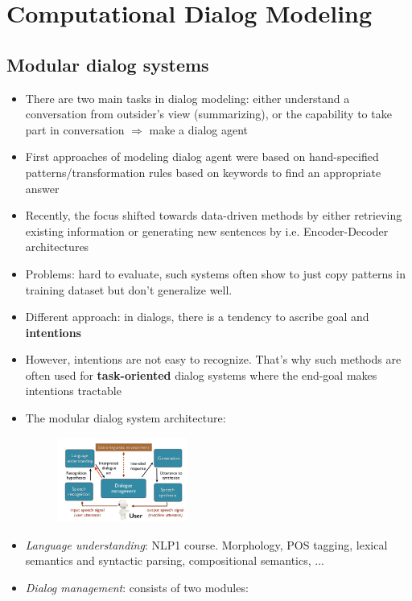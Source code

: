 \section{Computational Dialog Modeling}
\subsection{Modular dialog systems}
\begin{itemize}
	\item There are two main tasks in dialog modeling: either understand a conversation from outsider's view (summarizing), or the capability to take part in conversation $\Rightarrow$ make a dialog agent
	\item First approaches of modeling dialog agent were based on hand-specified patterns/transformation rules based on keywords to find an appropriate answer
	\item Recently, the focus shifted towards data-driven methods by either retrieving existing information or generating new sentences by i.e. Encoder-Decoder architectures
	\item Problems: hard to evaluate, such systems often show to just copy patterns in training dataset but don't generalize well.
	\item Different approach: in dialogs, there is a tendency to ascribe goal and \textbf{intentions}
	\item However, intentions are not easy to recognize. That's why such methods are often used for \textbf{task-oriented} dialog systems where the end-goal makes intentions tractable
	\item The modular dialog system architecture: 
	\begin{figure}[ht]
		\centering
		\includegraphics[width=0.4\textwidth]{figures/dialog_modeling_modules.png}
	\end{figure}
	\item \textit{Language understanding}: NLP1 course. Morphology, POS tagging, lexical semantics and syntactic parsing, compositional semantics, ...
	\item \textit{Dialog management}: consists of two modules:
	\begin{itemize}

\end{itemize}
\end{itemize}
